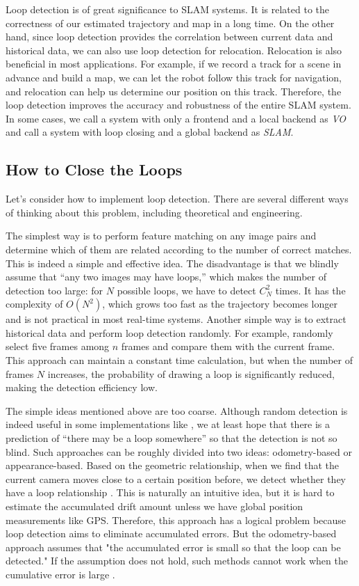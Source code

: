 Loop detection is of great significance to SLAM systems. It is related to the correctness of our estimated trajectory and map in a long time. On the other hand, since loop detection provides the correlation between current data and historical data, we can also use loop detection for relocation. Relocation is also beneficial in most applications. For example, if we record a track for a scene in advance and build a map, we can let the robot follow this track for navigation, and relocation can help us determine our position on this track. Therefore, the loop detection improves the accuracy and robustness of the entire SLAM system. In some cases, we call a system with only a frontend and a local backend as \textit{VO} and call a system with loop closing and a global backend as \textit{SLAM}.

\subsection{How to Close the Loops}
Let's consider how to implement loop detection. There are several different ways of thinking about this problem, including theoretical and engineering.


The simplest way is to perform feature matching on any image pairs and determine which of them are related according to the number of correct matches. This is indeed a simple and effective idea. The disadvantage is that we blindly assume that ``any two images may have loops,'' which makes the number of detection too large: for $N$ possible loops, we have to detect $C_N^2$ times. It has the complexity of $O(N^2)$, which grows too fast as the trajectory becomes longer and is not practical in most real-time systems. Another simple way is to extract historical data and perform loop detection randomly. For example, randomly select five frames among $n$ frames and compare them with the current frame. This approach can maintain a constant time calculation, but when the number of frames $N$ increases, the probability of drawing a loop is significantly reduced, making the detection efficiency low.

The simple ideas mentioned above are too coarse. Although random detection is indeed useful in some implementations like {\cite{Endres2014}}, we at least hope that there is a prediction of ``there may be a loop somewhere'' so that the detection is not so blind. Such approaches can be roughly divided into two ideas: odometry-based or appearance-based. Based on the geometric relationship, when we find that the current camera moves close to a certain position before, we detect whether they have a loop relationship \cite{Hahnel2003}. This is naturally an intuitive idea, but it is hard to estimate the accumulated drift amount unless we have global position measurements like GPS. Therefore, this approach has a logical problem because loop detection aims to eliminate accumulated errors. But the odometry-based approach assumes that "the accumulated error is small so that the loop can be detected." If the assumption does not hold, such methods cannot work when the cumulative error is large \cite{Beeson2010}.

